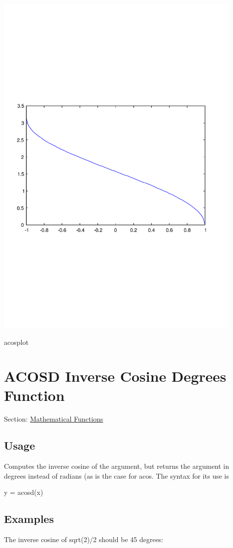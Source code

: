  
\begin{DoxyImage}
\includegraphics[width=12cm]{acosplot}
\caption{acosplot}
\end{DoxyImage}
 \hypertarget{mathfunctions_acosd}{}\section{A\-C\-O\-S\-D Inverse Cosine Degrees Function}\label{mathfunctions_acosd}
Section\-: \hyperlink{sec_mathfunctions}{Mathematical Functions} \hypertarget{vtkwidgets_vtkxyplotwidget_Usage}{}\subsection{Usage}\label{vtkwidgets_vtkxyplotwidget_Usage}
Computes the inverse cosine of the argument, but returns the argument in degrees instead of radians (as is the case for {\ttfamily acos}. The syntax for its use is \begin{DoxyVerb}   y = acosd(x)
\end{DoxyVerb}
 \hypertarget{variables_matrix_Examples}{}\subsection{Examples}\label{variables_matrix_Examples}
The inverse cosine of {\ttfamily sqrt(2)/2} should be 45 degrees\-:


